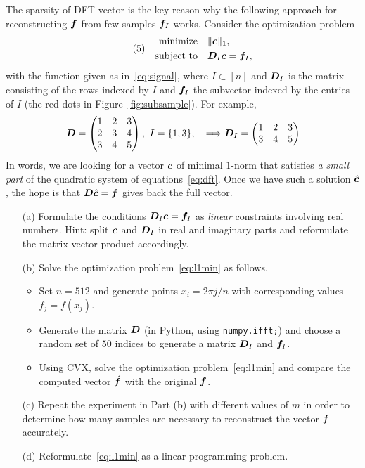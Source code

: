 \documentclass{article}
\begin{document}
The sparsity of DFT vector is the key reason why the following approach for reconstructing $\bm{f}$ from few samples $\bm{f}_I$ works. Consider the optimization problem
\begin{align}\label{eq:l1min}\tag{5}
\begin{split}
 \text{minimize}\quad & \Vert {\bm{c}}\Vert_1,\\
 \quad\text{subject to}\quad & \bm{D}_I\bm{c} = \bm{f}_I,
\end{split}
 \end{align}
with the function given as in~\eqref{eq:signal}, where $I\subset[n]$ and $\bm{D}_I$ is the matrix consisting of the rows indexed by $I$ and $\bm{f}_I$ the subvector indexed by the entries of $I$ (the red dots in Figure~\ref{fig:subsample}). For example,
\begin{equation*}
 \bm{D} = \begin{pmatrix} 1 & 2 & 3\\
            2 & 3 & 4\\
            3 & 4 & 5
           \end{pmatrix},
\ I=\{1,3\}, \quad \Longrightarrow \bm{D}_I = \begin{pmatrix} 1 & 2 & 3\\
            3 & 4 & 5
           \end{pmatrix}
\end{equation*}
In words, we are looking for a vector $\bm{c}$ of minimal $1$-norm that satisfies {\em a small part} of the quadratic system of equations~\eqref{eq:dft}. Once we have such a solution $\hat{\bm{c}}$, the hope is that $\bm{D}\hat{\bm{c}}=\bm{f}$ gives back the full vector. 

\begin{itemize}
 \item[(a)] Formulate the conditions $\bm{D}_I\bm{c}=\bm{f}_I$ as {\em linear} constraints involving real numbers. Hint: split $\bm{c}$ and $\bm{D}_I$ in real and imaginary parts and reformulate the matrix-vector product accordingly.
\item[(b)] Solve the optimization problem~\eqref{eq:l1min} as follows.
\begin{itemize}
\item Set $n=512$ and generate points $x_i=2\pi j/n$ with corresponding values $f_j=f(x_j)$. 
\item Generate the matrix $\bm{D}$ (in Python, using {\tt numpy.ifft;}) and
choose a random set of $50$ indices to generate a matrix $\bm{D}_I$ and $\bm{f}_I$. 
\item Using CVX, solve the optimization problem~\eqref{eq:l1min} and compare the computed vector $\hat{\bm{f}}$ with the original $\bm{f}$.
\end{itemize}
\item[(c)] Repeat the experiment in Part (b) with different values of $m$ in order to determine how many samples are necessary to reconstruct the vector $\bm{f}$ accurately.
\item[(d)] Reformulate~\eqref{eq:l1min} as a linear programming problem.
\end{itemize}
\end{document}
